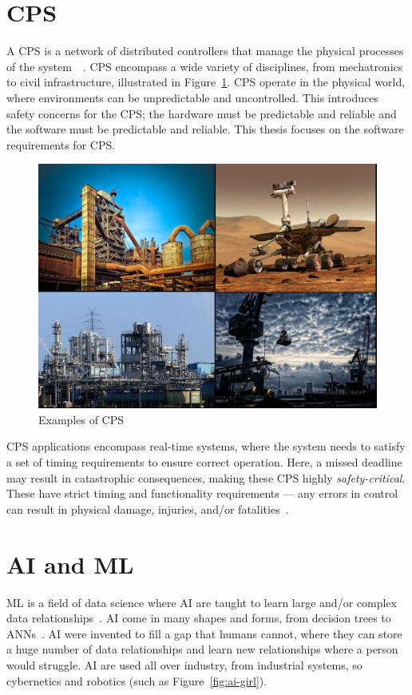 \section{\acf{CPS}}
A \acf{CPS} is a network of distributed controllers that manage the physical processes of the system~\cite{cps-design}~\cite{alur2015principles}. 
\ac{CPS} encompass a wide variety of disciplines, from mechatronics to civil infrastructure, illustrated in Figure~\ref{fig:cps}.
\ac{CPS} operate in the physical world, where environments can be unpredictable and uncontrolled.
This introduces safety concerns for the \ac{CPS}; the hardware must be predictable and reliable and the software must be predictable and reliable.
This thesis focuses on the software requirements for \ac{CPS}.

\begin{figure}[H]
	\centering
	\includegraphics[width=\textwidth]{Content/fig/1234.pdf}
	\caption{Examples of \ac{CPS}~\cite{industry-pic}~\cite{crane-pic}~\cite{rover-pic}~\cite{factory-pic} \label{fig:cps}}
\end{figure}

\ac{CPS} applications encompass real-time systems, where the system needs to satisfy a set of timing requirements to ensure correct operation. 
Here, a missed deadline may result in catastrophic consequences, making these \ac{CPS} highly \textit{safety-critical}. 
These have strict timing and functionality requirements --- any errors in control can result in physical damage, injuries, and/or fatalities~\cite{ANNDevModel1999}. 


\section{\acf{AI} and \acf{ML}}
\acf{ML} is a field of data science where \acf{AI} are taught to learn large and/or complex data relationships~\cite{ai}.
\ac{AI} come in many shapes and forms, from decision trees to \acfp{ANN}~\cite{ai-types}.
\ac{AI} were invented to fill a gap that humans cannot, where they can store a huge number of data relationships and learn new relationships where a person would struggle.
\ac{AI} are used all over industry, from industrial systems, so cybernetics and robotics (such as Figure~\ref{fig:ai-girl}).

